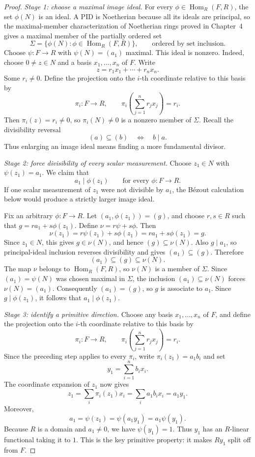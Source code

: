 \begin{proof}
\emph{Stage 1: choose a maximal image ideal.}
For every \(\phi\in\operatorname{Hom}_R(F,R)\), the set \(\phi(N)\) is an
ideal.  A PID is Noetherian because all its ideals are principal, so the
maximal-member characterization of Noetherian rings proved in Chapter~4
gives a maximal member of the partially ordered set
\[
\Sigma=\{\phi(N):\phi\in\operatorname{Hom}_R(F,R)\},
\qquad\text{ordered by set inclusion}.
\]
Choose \(\psi:F\to R\) with \(\psi(N)=(a_1)\) maximal.  This ideal is
nonzero. Indeed, choose \(0\ne z\in N\) and a basis
\(x_1,\ldots,x_n\) of \(F\). Write
\[
z=r_1x_1+\cdots+r_nx_n.
\]
Some \(r_i\ne0\). Define the projection onto the \(i\)-th coordinate
relative to this basis by
\[
\pi_i:F\longrightarrow R,
\qquad
\pi_i\left(\sum_{j=1}^n r_jx_j\right)=r_i.
\]
Then \(\pi_i(z)=r_i\ne0\), so \(\pi_i(N)\ne0\) is a nonzero member of
\(\Sigma\). Recall the divisibility reversal
\[
(a)\subseteq(b)\quad\Longleftrightarrow\quad b\mid a.
\]
Thus enlarging an image ideal means finding a more fundamental divisor.

\emph{Stage 2: force divisibility of every scalar measurement.}
Choose \(z_1\in N\) with \(\psi(z_1)=a_1\).  We claim that
\[
a_1\mid\phi(z_1)
\qquad\text{for every }\phi:F\to R.
\]
If one scalar measurement of \(z_1\) were not divisible by \(a_1\), the
B\'ezout calculation below would produce a strictly larger image ideal.

Fix an arbitrary \(\phi:F\to R\). Let \((a_1,\phi(z_1))=(g)\), and choose
\(r,s\in R\) such that
\(g=ra_1+s\phi(z_1)\). Define \(\nu=r\psi+s\phi\). Then
\[
\nu(z_1)=r\psi(z_1)+s\phi(z_1)
=ra_1+s\phi(z_1)=g.
\]
Since \(z_1\in N\), this gives \(g\in\nu(N)\), and hence
\((g)\subseteq\nu(N)\). Also \(g\mid a_1\), so principal-ideal inclusion
reverses divisibility and gives \((a_1)\subseteq(g)\). Therefore
\[
(a_1)\subseteq(g)\subseteq\nu(N).
\]
The map \(\nu\) belongs to \(\operatorname{Hom}_R(F,R)\), so \(\nu(N)\)
is a member of \(\Sigma\). Since \((a_1)=\psi(N)\) was chosen maximal in
\(\Sigma\), the inclusion \((a_1)\subseteq\nu(N)\) forces
\(\nu(N)=(a_1)\). Consequently \((a_1)=(g)\), so \(g\) is associate to
\(a_1\). Since \(g\mid\phi(z_1)\), it follows that
\(a_1\mid\phi(z_1)\).

\emph{Stage 3: identify a primitive direction.}
Choose any basis \(x_1,\ldots,x_n\) of \(F\), and define the projection onto
the \(i\)-th coordinate relative to this basis by
\[
\pi_i:F\longrightarrow R,
\qquad
\pi_i\left(\sum_{j=1}^n r_jx_j\right)=r_i.
\]
Since the preceding step applies to every \(\pi_i\), write
\(\pi_i(z_1)=a_1b_i\) and set
\[
y_1=\sum_{i=1}^n b_ix_i.
\]
The coordinate expansion of \(z_1\) now gives
\[
z_1=\sum_i\pi_i(z_1)x_i
=\sum_i a_1b_ix_i=a_1y_1.
\]
Moreover,
\[
a_1=\psi(z_1)=\psi(a_1y_1)=a_1\psi(y_1).
\]
Because \(R\) is a domain and \(a_1\ne0\), we have \(\psi(y_1)=1\).
Thus \(y_1\) has an \(R\)-linear functional taking it to \(1\). This is the
key primitive property: it makes \(Ry_1\) split off from \(F\).


\end{proof}
